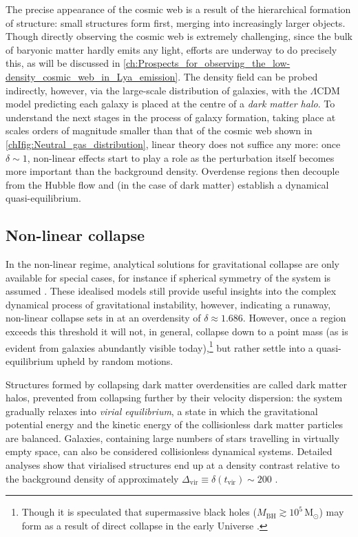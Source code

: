 The precise appearance of the cosmic web is a result of the hierarchical formation of structure: small structures form first, merging into increasingly larger objects. Though directly observing the cosmic web is extremely challenging, since the bulk of baryonic matter hardly emits any light, efforts are underway to do precisely this, as will be discussed in \cref{ch:Prospects_for_observing_the_low-density_cosmic_web_in_Lya_emission}. The density field can be probed indirectly, however, via the large-scale distribution of galaxies, with the $\Lambda$CDM model predicting each galaxy is placed at the centre of a \textit{dark matter halo}. To understand the next stages in the process of galaxy formation, taking place at scales orders of magnitude smaller than that of the cosmic web shown in \cref{chIfig:Neutral_gas_distribution}, linear theory does not suffice any more: once $\delta \sim 1$, non-linear effects start to play a role as the perturbation itself becomes more important than the background density. Overdense regions then decouple from the Hubble flow and (in the case of dark matter) establish a dynamical quasi-equilibrium.

\subsection{Non-linear collapse}
\label{chIssec:Non-linear_collapse}

In the non-linear regime, analytical solutions for gravitational collapse are only available for special cases, for instance if spherical symmetry of the system is assumed \citep[e.g.][]{1972ApJ...176....1G}. These idealised models still provide useful insights into the complex dynamical process of gravitational instability, however, indicating a runaway, non-linear collapse sets in at an overdensity of $\delta \approx 1.686$. However, once a region exceeds this threshold it will not, in general, collapse down to a point mass (as is evident from galaxies abundantly visible today),\footnote{Though it is speculated that supermassive black holes ($M_\text{BH} \gtrsim 10^5 \, \mathrm{M_\odot}$) may form as a result of direct collapse in the early Universe \citep[e.g.][]{2003ApJ...596...34B}.} but rather settle into a quasi-equilibrium upheld by random motions.

Structures formed by collapsing dark matter overdensities are called dark matter halos, prevented from collapsing further by their velocity dispersion: the system gradually relaxes into \textit{virial equilibrium}, a state in which the gravitational potential energy and the kinetic energy of the collisionless dark matter particles are balanced. Galaxies, containing large numbers of stars travelling in virtually empty space, can also be considered collisionless dynamical systems. Detailed analyses show that virialised structures end up at a density contrast relative to the background density of approximately $\Delta_\text{vir} \equiv \delta (t_\text{vir}) \sim 200$ \citep{1998ApJ...495...80B}.


